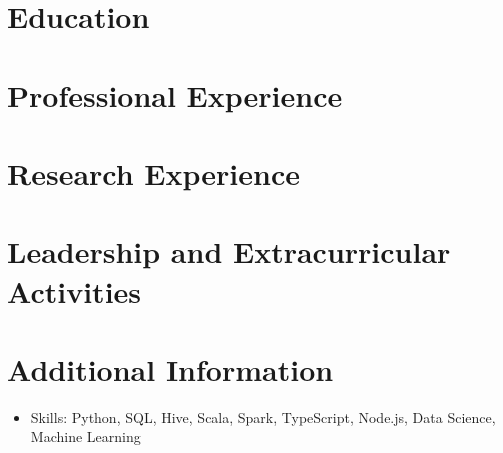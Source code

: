 \documentclass{resumeEN}
\begin{document}
\section{Education}

\pennmaster
\thuundergrad
\umnexchange

\section{Professional Experience}

\msra
\bytedance

\section{Research Experience}

\ryanresearch

\section{Leadership and Extracurricular Activities}

\eydatascience
\cnkibibtex

\section{Additional Information}

\vspace{0.618ex}
\begin{itemize}
\item Skills: Python, SQL, Hive, Scala, Spark, TypeScript, Node.js, Data Science, Machine Learning
\end{itemize}
\end{document}

